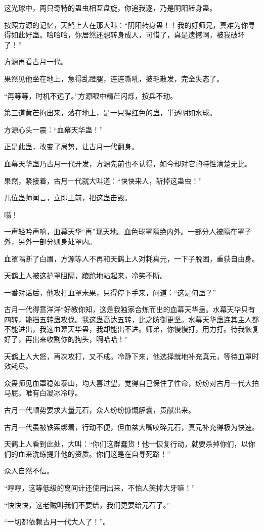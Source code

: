 \begin{this_body}
这光球中，两只奇特的蛊虫相互盘旋，你追我逐，乃是阴阳转身蛊。

按照方源的记忆，天鹤上人在那大叫：“阴阳转身蛊！！我的好师兄，真难为你寻得如此好蛊。哈哈哈，你居然还想转身成人，可惜了，真是遗憾啊，被我破坏了！”

方源再看古月一代。

果然见他坐在地上，急得乱蹬腿，连连嘶吼，披毛散发，完全失态了。

“再等等，时机不远了。”方源眼中精芒闪烁，按兵不动。

第三道黄芒拘出来，落在地上，是一只猩红色的蛊，半透明如水球。

方源心头一震：“血幕天华蛊！”

正是此蛊，改变了局势，让古月一代翻身。

血幕天华蛊乃古月一代开发，方源先前也不认得，如今却对它的特性清楚无比。

果然，紧接着，古月一代就大叫道：“快快来人，斩掉这蛊虫！”

几位蛊师闻言，立即上前，把这蛊击毁。

嗡！

一声轻吟声响，血幕天华“再”现天地。血色球罩隔绝内外。一部分人被隔在罩子外，另外一部分则身处罩内。

血罩隔断了白眉，方源等人不再和天鹤上人对耗真元，一下子脱困，重获自由身。

天鹤上人被这护罩阻隔，踉跄地站起来，冷笑不断。

一番对话后，他攻打血罩未果，只得停下手来，问道：“这是何蛊？”

古月一代得意洋洋“好教你知，这是我独家合炼而出的血幕天华蛊。水幕天华只有四转，能挡五转蛊攻伐。我这蛊高达五转，比之防御更坚。水幕天华蛊连其主人都不能进出，我这血幕天华蛊，我却能出不进。师弟，你慢慢打，用力打。待我恢复好了，再出来收割你的狗头，啊哈哈！”

天鹤上人大怒，再次攻打，又不成。冷静下来，他选择就地补充真元，等待血罩时效耗尽。

众蛊师见血罩稳如泰山，均大喜过望，觉得自己保住了性命，纷纷对古月一代大拍马屁。唯有白凝冰冷哼。

古月一代顺势要求大量元石，众人纷纷慷慨解囊，贡献出来。

古月一代虽被铁索绑着，行动不便，但血盆大嘴咬碎元石，真元补充得极为快速。

天鹤上人看到此处，大叫：“你们这群蠢货！他一恢复行动，就要杀掉你们，以你们的血来洗练提升他的资质。你们这是在自寻死路！”

众人自然不信。

“哼哼，这等低级的离间计还使用出来，不怕人笑掉大牙嘛！”

“快快快，这老贼叫我们不要给，我们更要给元石了。”

“一切都依赖古月一代大人了！”。

\end{this_body}

